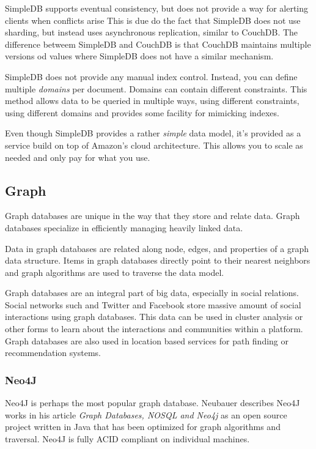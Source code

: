 \documentclass[]{article}
\begin{document}
SimpleDB supports eventual consistency, but does not provide a way for alerting clients when conflicts arise This is due do the fact that SimpleDB does not use sharding, but instead uses asynchronous replication, similar to CouchDB. The difference betweem SimpleDB and CouchDB is that CouchDB maintains multiple versions od values where SimpleDB does not have a similar mechanism.

SimpleDB does not provide any manual index control. Instead, you can define multiple \textit{domains} per document. Domains can contain different constraints. This method allows data to be queried in multiple ways, using different constraints, using different domains and provides some facility for mimicking indexes.

Even though SimpleDB provides a rather \textit{simple} data model, it's provided as a service build on top of Amazon's cloud architecture. This allows you to scale as needed and only pay for what you use. 

\subsection{Graph}
Graph databases are unique in the way that they store and relate data. Graph databases specialize in efficiently managing heavily linked data\cite{cattell_scalable_2011}.

Data in graph databases are related along node, edges, and properties of a graph data structure\cite{sharma_extended_2015}. Items in graph databases directly point to their nearest neighbors and graph algorithms are used to traverse the data model.

Graph databases are an integral part of big data, especially in social relations. Social networks such and Twitter and Facebook store massive amount of social interactions using graph databases. This data can be used in cluster analysis or other forms to learn about the interactions and communities within a platform. Graph databases are also used in location based services for path finding or recommendation systems\cite{cattell_scalable_2011}.

\subsubsection{Neo4J}
Neo4J is perhaps the most popular graph database. Neubauer describes Neo4J works in his article \textit{Graph Databases, NOSQL and Neo4j}\cite{neubauer_2010} as an open source project written in Java that has been optimized for graph algorithms and traversal. Neo4J is fully ACID compliant on individual machines.
\end{document}
